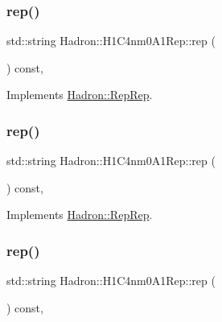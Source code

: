 \subsubsection{\texorpdfstring{rep()}{rep()}\hspace{0.1cm}{\footnotesize\ttfamily [1/3]}}
{\footnotesize\ttfamily std\+::string Hadron\+::\+H1\+C4nm0\+A1\+Rep\+::rep (\begin{DoxyParamCaption}{ }\end{DoxyParamCaption}) const\hspace{0.3cm}{\ttfamily [inline]}, {\ttfamily [virtual]}}



Implements \mbox{\hyperlink{structHadron_1_1RepRep_ab3213025f6de249f7095892109575fde}{Hadron\+::\+Rep\+Rep}}.

\mbox{\label{structHadron_1_1H1C4nm0A1Rep_acc6e3a3585fdfea2b5ef14c6035964e2}} 
\subsubsection{\texorpdfstring{rep()}{rep()}\hspace{0.1cm}{\footnotesize\ttfamily [2/3]}}
{\footnotesize\ttfamily std\+::string Hadron\+::\+H1\+C4nm0\+A1\+Rep\+::rep (\begin{DoxyParamCaption}{ }\end{DoxyParamCaption}) const\hspace{0.3cm}{\ttfamily [inline]}, {\ttfamily [virtual]}}



Implements \mbox{\hyperlink{structHadron_1_1RepRep_ab3213025f6de249f7095892109575fde}{Hadron\+::\+Rep\+Rep}}.

\mbox{\label{structHadron_1_1H1C4nm0A1Rep_acc6e3a3585fdfea2b5ef14c6035964e2}} 
\subsubsection{\texorpdfstring{rep()}{rep()}\hspace{0.1cm}{\footnotesize\ttfamily [3/3]}}
{\footnotesize\ttfamily std\+::string Hadron\+::\+H1\+C4nm0\+A1\+Rep\+::rep (\begin{DoxyParamCaption}{ }\end{DoxyParamCaption}) const\hspace{0.3cm}{\ttfamily [inline]}, {\ttfamily [virtual]}}



